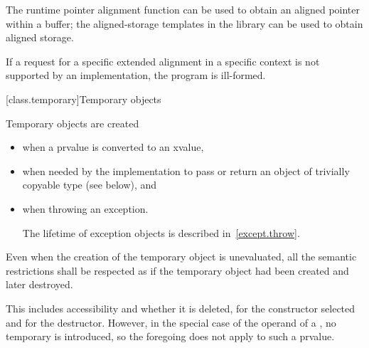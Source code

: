 \pnum
\begin{note}
The runtime pointer alignment function
can be used to obtain an aligned pointer within a buffer; the aligned-storage templates
in the library can be used to obtain aligned storage.
\end{note}

\pnum
If a request for a specific extended alignment in a specific context is not
supported by an implementation, the program is ill-formed.

[class.temporary]{Temporary objects}

\pnum
{}%
%
%
%
%
Temporary objects are created
\begin{itemize}
\item
when a prvalue is converted to an xvalue,
\item
when needed by the implementation to pass or return an object of trivially copyable type (see below),
and
\item
when throwing an exception.
\begin{note}
The lifetime of exception objects is described in~\ref{except.throw}.
\end{note}
\end{itemize}
Even when the creation of the temporary object is
unevaluated,
all the semantic restrictions shall be respected as if the temporary object
had been created and later destroyed.
\begin{note}
This includes accessibility and whether it is deleted,
for the constructor selected and for the destructor. However, in the special
case of the operand of a
, no temporary is introduced,
so the foregoing does not apply to such a prvalue.
\end{note}

